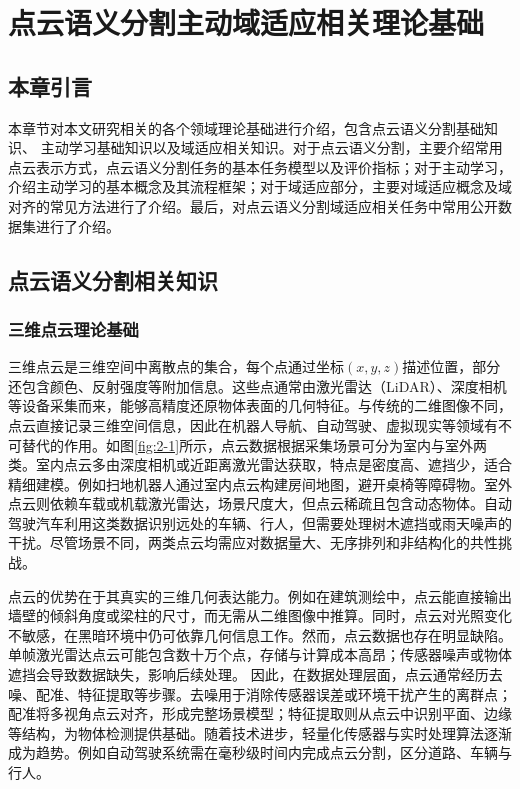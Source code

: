 \chapter{点云语义分割主动域适应相关理论基础}
\thispagestyle{others}
\pagestyle{others}
\xiaosi
\section{本章引言}
本章节对本文研究相关的各个领域理论基础进行介绍，包含点云语义分割基础知识、 主动学习基础知识以及域适应相关知识。对于点云语义分割，主要介绍常用点云表示方式，点云语义分割任务的基本任务模型以及评价指标；对于主动学习，介绍主动学习的基本概念及其流程框架；对于域适应部分，主要对域适应概念及域对齐的常见方法进行了介绍。最后，对点云语义分割域适应相关任务中常用公开数据集进行了介绍。

\section{点云语义分割相关知识}
\subsection{三维点云理论基础}
三维点云是三维空间中离散点的集合，每个点通过坐标$(x, y, z)$描述位置，部分还包含颜色、反射强度等附加信息。这些点通常由激光雷达（LiDAR）、深度相机等设备采集而来，能够高精度还原物体表面的几何特征。与传统的二维图像不同，点云直接记录三维空间信息，因此在机器人导航、自动驾驶、虚拟现实等领域有不可替代的作用。如图\ref{fig:2-1}所示，点云数据根据采集场景可分为室内与室外两类。室内点云多由深度相机或近距离激光雷达获取，特点是密度高、遮挡少，适合精细建模。例如扫地机器人通过室内点云构建房间地图，避开桌椅等障碍物。室外点云则依赖车载或机载激光雷达，场景尺度大，但点云稀疏且包含动态物体。自动驾驶汽车利用这类数据识别远处的车辆、行人，但需要处理树木遮挡或雨天噪声的干扰。尽管场景不同，两类点云均需应对数据量大、无序排列和非结构化的共性挑战。  

点云的优势在于其真实的三维几何表达能力。例如在建筑测绘中，点云能直接输出墙壁的倾斜角度或梁柱的尺寸，而无需从二维图像中推算。同时，点云对光照变化不敏感，在黑暗环境中仍可依靠几何信息工作。然而，点云数据也存在明显缺陷。单帧激光雷达点云可能包含数十万个点，存储与计算成本高昂；传感器噪声或物体遮挡会导致数据缺失，影响后续处理。%
因此，在数据处理层面，点云通常经历去噪、配准、特征提取等步骤。去噪用于消除传感器误差或环境干扰产生的离群点；配准将多视角点云对齐，形成完整场景模型；特征提取则从点云中识别平面、边缘等结构，为物体检测提供基础。随着技术进步，轻量化传感器与实时处理算法逐渐成为趋势。例如自动驾驶系统需在毫秒级时间内完成点云分割，区分道路、车辆与行人。%

